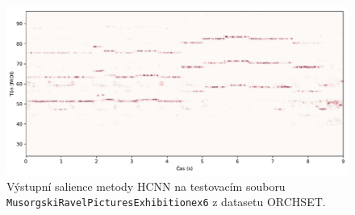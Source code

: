 \begin{figure}[h]\centering
\includegraphics[scale=0.4]{../img/vysledky/orchset_Musorgski-Ravel-PicturesExhibition-ex6_salience}
\caption{Výstupní salience metody HCNN na testovacím souboru \texttt{Musorg\allowbreak{}ski\-Ravel\-Pictures\allowbreak{}Exhibition\-ex6} z datasetu ORCHSET.}
\label{obr:orchset_Musorgski-Ravel-PicturesExhibition-ex6_salience}
\end{figure}


